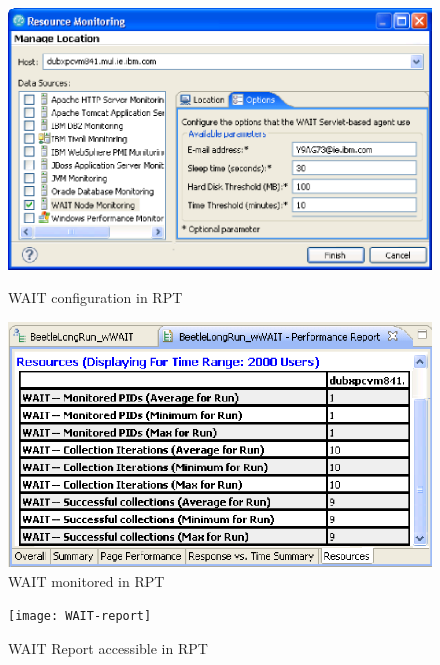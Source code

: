 \documentclass[runningheads,a4paper]{llncs}
\begin{document}
\vspace{-5pt}
\begin{figure}
\centering
\begin{minipage}[b]{.50\textwidth}

\centering
\includegraphics[totalheight=.27\textheight,width=1.0\textwidth]{WAIT-config}
\caption{WAIT configuration in RPT}
\label{fig_config}

\end{minipage}\qquad
\begin{minipage}[b]{.44\textwidth}

\centering
\includegraphics[totalheight=.27\textheight,width=1.0\textwidth]{WAIT-monitoring}
\caption{WAIT monitored in RPT}
\label{fig_mon}

\end{minipage}
\end{figure}
\vspace{-5pt}


\begin{figure}[!h]
\centering
\texttt{[image: WAIT-report]}
\caption{WAIT Report accessible in RPT}
\label{fig_report}
\end{figure}
\end{document}
